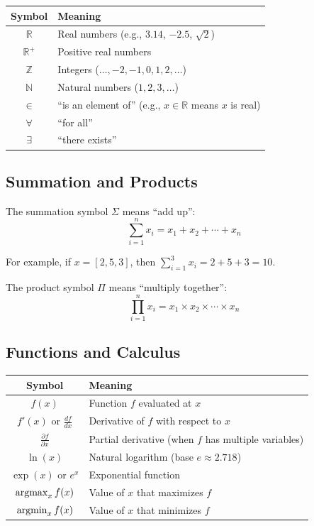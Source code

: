 \begin{center}
\begin{tabular}{cl}
\toprule
\textbf{Symbol} & \textbf{Meaning} \\
\midrule
$\mathbb{R}$ & Real numbers (e.g., $3.14$, $-2.5$, $\sqrt{2}$) \\
$\mathbb{R}^+$ & Positive real numbers \\
$\mathbb{Z}$ & Integers ($\ldots, -2, -1, 0, 1, 2, \ldots$) \\
$\mathbb{N}$ & Natural numbers ($1, 2, 3, \ldots$) \\
$\in$ & ``is an element of'' (e.g., $x \in \mathbb{R}$ means $x$ is real) \\
$\forall$ & ``for all'' \\
$\exists$ & ``there exists'' \\
\bottomrule
\end{tabular}
\end{center}

\subsection{Summation and Products}


The summation symbol $\Sigma$ means ``add up'':
\[
\sum_{i=1}^{n} x_i = x_1 + x_2 + \cdots + x_n
\]

For example, if $x = [2, 5, 3]$, then $\sum_{i=1}^{3} x_i = 2 + 5 + 3 = 10$.


The product symbol $\Pi$ means ``multiply together'':
\[
\prod_{i=1}^{n} x_i = x_1 \times x_2 \times \cdots \times x_n
\]

\subsection{Functions and Calculus}

\begin{center}
\begin{tabular}{cl}
\toprule
\textbf{Symbol} & \textbf{Meaning} \\
\midrule
$f(x)$ & Function $f$ evaluated at $x$ \\
$f'(x)$ or $\frac{df}{dx}$ & Derivative of $f$ with respect to $x$ \\
$\frac{\partial f}{\partial x}$ & Partial derivative (when $f$ has multiple variables) \\
$\ln(x)$ & Natural logarithm (base $e \approx 2.718$) \\
$\exp(x)$ or $e^x$ & Exponential function \\
$\operatorname*{argmax}_x f(x)$ & Value of $x$ that maximizes $f$ \\
$\operatorname*{argmin}_x f(x)$ & Value of $x$ that minimizes $f$ \\
\bottomrule
\end{tabular}
\end{center}

